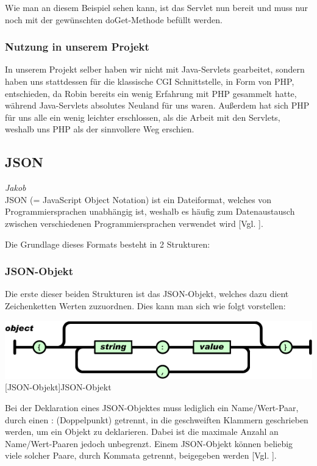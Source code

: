 \documentclass[12pt,a4paper,bibliography=totocnumbered,listof=totocnumbered]{scrartcl}
\begin{document}
Wie man an diesem Beispiel sehen kann, ist das Servlet nun bereit und muss nur noch mit der gewünschten doGet-Methode befüllt werden.
\subsubsection{Nutzung in unserem Projekt}
In unserem Projekt selber haben wir nicht mit Java-Servlets gearbeitet, sondern haben uns stattdessen für die klassische CGI Schnittstelle, in Form von PHP, entschieden, da Robin bereits ein wenig Erfahrung mit PHP gesammelt hatte, während Java-Servlets absolutes Neuland für uns waren.
Außerdem hat sich PHP für uns alle ein wenig leichter erschlossen, als die Arbeit mit den Servlets, weshalb uns PHP als der sinnvollere Weg erschien.


\subsection{JSON}
\label{sec:JSON}
\emph{Jakob}\\
JSON (= JavaScript Object Notation) ist ein Dateiformat, welches von Programmiersprachen unabhängig ist, weshalb es häufig zum Datenaustausch zwischen verschiedenen Programmiersprachen verwendet wird [Vgl. \cite{json}].

Die Grundlage dieses Formats besteht in 2 Strukturen:

\subsubsection{JSON-Objekt}
\label{sec:JSON-Objekt}
Die erste dieser beiden Strukturen ist das JSON-Objekt, welches dazu dient Zeichenketten Werten zuzuordnen.
Dies kann man sich wie folgt vorstellen:


\vspace{1em}
\begin{minipage}{\linewidth}
	\centering
	\includegraphics[width=0.9\linewidth]{Bilder/json-object.png}
	[JSON-Objekt]{JSON-Objekt\footnotemark }
	\label{fig:json-objekt}
\end{minipage}

Bei der Deklaration eines JSON-Objektes muss lediglich ein Name/Wert-Paar, durch einen \glqq :\grqq{} (Doppelpunkt) getrennt, in die geschweiften Klammern geschrieben werden, um ein Objekt zu deklarieren.
Dabei ist die maximale Anzahl an Name/Wert-Paaren jedoch unbegrenzt. Einem JSON-Objekt können beliebig viele solcher Paare, durch Kommata getrennt, beigegeben werden [Vgl. \cite{json}].
\end{document}
